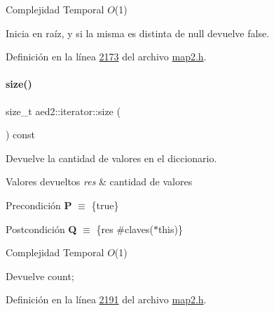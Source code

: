 \begin{DoxyDescription}
\item[Complejidad Temporal]$O$(1)
\end{DoxyDescription}Inicia en raíz, y si la misma es distinta de null devuelve false. 

Definición en la línea \hyperlink{map2_8h_source_l02173}{2173} del archivo \hyperlink{map2_8h_source}{map2.\+h}.

\mbox{\label{classaed2_1_1iterator_aa07bd4de2aeca4a6936fdbe9013be2ee_aa07bd4de2aeca4a6936fdbe9013be2ee}} 
\paragraph{\texorpdfstring{size()}{size()}}
{\footnotesize\ttfamily size\+\_\+t aed2\+::iterator\+::size (\begin{DoxyParamCaption}{ }\end{DoxyParamCaption}) const\hspace{0.3cm}{\ttfamily [inline]}}



Devuelve la cantidad de valores en el diccionario. 


\begin{DoxyRetVals}{Valores devueltos}
{\em res} & cantidad de valores\\
\hline
\end{DoxyRetVals}
\begin{DoxyPrecond}{Precondición}
{\bfseries P} $\equiv$ \{true\} 
\end{DoxyPrecond}
\begin{DoxyPostcond}{Postcondición}
{\bfseries Q} $\equiv$ \{res  \#claves($\ast$this)\}
\end{DoxyPostcond}

\begin{DoxyDescription}
\item[Complejidad Temporal]$O$(1)
\end{DoxyDescription}Devuelve count; 

Definición en la línea \hyperlink{map2_8h_source_l02191}{2191} del archivo \hyperlink{map2_8h_source}{map2.\+h}.

\mbox{\label{classaed2_1_1iterator_ab9446668ad5619115b6c4a10eac83d68_ab9446668ad5619115b6c4a10eac83d68}} 
